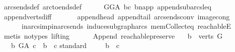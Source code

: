 \begin{isabellebody}
\ arcs{\isacharunderscore}{\kern0pt}ends{\isacharunderscore}{\kern0pt}def\ arc{\isacharunderscore}{\kern0pt}to{\isacharunderscore}{\kern0pt}ends{\isacharunderscore}{\kern0pt}def\isanewline
\ \ \ \ \isamarkupfalse%
\ GG{\isacharunderscore}{\kern0pt}A\ bc\ b{\isacharunderscore}{\kern0pt}napp\ append{\isacharunderscore}{\kern0pt}subarcs{\isacharunderscore}{\kern0pt}leq\isanewline
\ \ \ \ \isamarkupfalse%
\ append{\isacharunderscore}{\kern0pt}verts{\isacharunderscore}{\kern0pt}diff\ \isanewline
\ \ \ \ \isamarkupfalse%
\ append{\isacharunderscore}{\kern0pt}head{\isacharprime}{\kern0pt}\ append{\isacharunderscore}{\kern0pt}tail{\isacharprime}{\kern0pt}\ arcs{\isacharunderscore}{\kern0pt}ends{\isacharunderscore}{\kern0pt}conv\ image{\isacharunderscore}{\kern0pt}cong\ \isanewline
\ \ \ \ \ \ in{\isacharunderscore}{\kern0pt}arcs{\isacharunderscore}{\kern0pt}imp{\isacharunderscore}{\kern0pt}in{\isacharunderscore}{\kern0pt}arcs{\isacharunderscore}{\kern0pt}ends\ induce{\isacharunderscore}{\kern0pt}subgraph{\isacharunderscore}{\kern0pt}arcs\ mem{\isacharunderscore}{\kern0pt}Collect{\isacharunderscore}{\kern0pt}eq\ reachableE\isanewline
\ \ \ \ \isamarkupfalse%
\ {\isacharparenleft}{\kern0pt}metis\ {\isacharparenleft}{\kern0pt}no{\isacharunderscore}{\kern0pt}types{\isacharcomma}{\kern0pt}\ lifting{\isacharparenright}{\kern0pt}{\isacharparenright}{\kern0pt}\ \ \ \ \isanewline
{}\isamarkupfalse%
%
\endisatagproof
{\isafoldproof}%
%
\isadelimproof
\isanewline
%
\endisadelimproof
\isanewline
\isanewline
{}\isamarkupfalse%
\ {\isacharparenleft}{\kern0pt}\ Append{\isacharparenright}{\kern0pt}\ reachable{}{\isacharunderscore}{\kern0pt}preserve{\isacharcolon}{\kern0pt}\isanewline
\ \ \ {\isachardoublequoteopen}b\ {\isasymin}\ verts\ G{\isachardoublequoteclose}\isanewline
\ \ \ {\isachardoublequoteopen}{\isacharparenleft}{\kern0pt}b\ {\isasymrightarrow}\isactrlsup {\isacharplus}{\kern0pt}\isactrlbsub G{\isacharunderscore}{\kern0pt}A\isactrlesub \ c{\isacharparenright}{\kern0pt}\ {\isasymlongleftrightarrow}\ b\ {\isasymrightarrow}\isactrlsup {\isacharplus}{\kern0pt}\ c{\isachardoublequoteclose}\isanewline
%
\isadelimproof
%
\endisadelimproof
%
\isatagproof
{}\isamarkupfalse%
{\isacharparenleft}{\kern0pt}standard{\isacharparenright}{\kern0pt}\isanewline
\ \ \isamarkupfalse%
\ \ {\isachardoublequoteopen}b\ {\isasymrightarrow}\isactrlsup {\isacharplus}{\kern0pt}\ c{\isachardoublequoteclose}\isanewline

\end{isabellebody}
